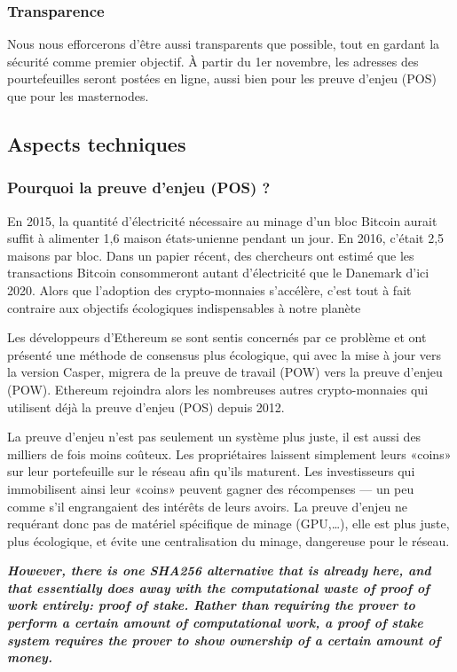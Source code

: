   \subsubsection{Transparence}
Nous nous efforcerons d'être aussi transparents que possible, tout en gardant la sécurité comme premier objectif. À partir du 1er novembre, les adresses des pourtefeuilles seront postées en ligne, aussi bien pour les preuve d'enjeu (POS) que pour les masternodes.


 \subsection{Aspects techniques}
  \subsubsection{Pourquoi la preuve d'enjeu (POS) ?}
En 2015, la quantité d'électricité nécessaire au minage d'un bloc Bitcoin aurait suffit à alimenter 1,6 maison états-unienne pendant un jour. En 2016, c'était 2,5 maisons par bloc. Dans un papier récent, des chercheurs ont estimé que les transactions Bitcoin consommeront autant d'électricité que le Danemark d'ici 2020. Alors que l'adoption des crypto-monnaies s'accélère, c'est tout à fait contraire aux objectifs écologiques indispensables à notre planète

Les développeurs d'Ethereum se sont sentis concernés par ce problème et ont présenté une méthode de consensus plus écologique, qui avec la mise à jour vers la version Casper, migrera de la preuve de travail (POW) vers la preuve d'enjeu (POW).
 Ethereum rejoindra alors les nombreuses autres crypto-monnaies qui utilisent déjà la preuve d'enjeu (POS) depuis 2012.

La preuve d'enjeu n'est pas seulement un système plus juste, il est aussi des milliers de fois moins coûteux. Les propriétaires laissent simplement leurs «coins» sur leur portefeuille sur le réseau afin qu'ils maturent. Les investisseurs qui immobilisent ainsi leur «coins» peuvent gagner des récompenses — un peu comme s'il engrangaient des intérêts de leurs avoirs. La preuve d'enjeu ne requérant donc pas de matériel spécifique de minage (GPU,…), elle est plus juste, plus écologique, et évite une centralisation du minage, dangereuse pour le réseau.

\textbf{\emph{However, there is one SHA256 alternative that is already here, and that essentially does away with the computational waste of proof of work entirely: proof of stake. Rather than requiring the prover to perform a certain amount of computational work, a proof of stake system requires the prover to show ownership of a certain amount of money.}} \cite{vbuterin2013}

